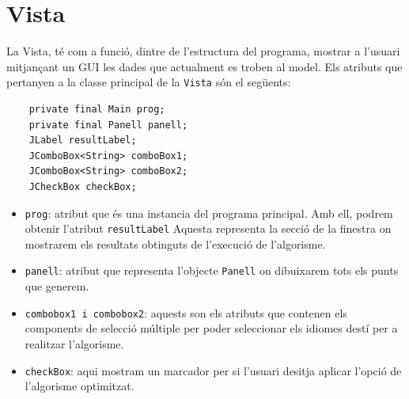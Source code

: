 \documentclass[conference]{IEEEtran}
\begin{document}
\section{Vista}
La Vista, té com a funció, dintre de l’estructura del programa, mostrar a l’usuari mitjançant un GUI les dades que actualment es troben al model. Els atributs que pertanyen a la
classe principal de la \texttt{Vista} són el següents:
\begin{verbatim}
    private final Main prog;
    private final Panell panell;
    JLabel resultLabel;
    JComboBox<String> comboBox1;
    JComboBox<String> comboBox2;
    JCheckBox checkBox;
\end{verbatim}
\begin{itemize}
    \item \texttt{prog}: atribut que és una instancia del programa principal. Amb ell, podrem obtenir l'atribut \texttt{resultLabel} Aquesta representa la secció de la finestra on mostrarem els resultats obtinguts de l'execució de l'algorisme.\\
    \item \texttt{panell}: atribut que representa l'objecte \texttt{Panell} on dibuixarem tots els punts que generem.\\
    \item \texttt{combobox1 i combobox2}:  aquests son els atributs que contenen els components de selecció múltiple per poder seleccionar els idiomes destí per a realitzar l'algorisme.\\
    \item \texttt{checkBox}: aqui mostram un marcador per si l'usuari desitja aplicar l'opció de l'algorisme optimitzat.
\end{itemize}
\end{document}
